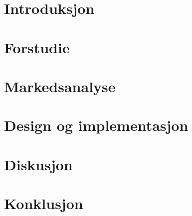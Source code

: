 \documentclass[11pt, a4paper]{report}
\newcommand{\comment}[1]{} \comment{This is a block comment wrapped in curly brackets}
\begin{document}


%
\begin{abstract}
\noindent

\end{abstract}

\pagestyle{empty}
\tableofcontents
\newpage
\pagestyle{fancy}


\comment{ foreløpig struktur på rapport:
Sammendrag
Innhold
Introduksjon
	Gruppen
	Initiativet
	Problemet
	Ideen
Pre study
	Mekanikk
	Hardware
	Software
Markedsundersøkelse
	generelt
	4 p'er
Løsning
	valg av løsning
	hardware
	software
		GUI
	diskusjon
Konklusjon
Referanseliste
Vedlegg
}
\chapter{Introduksjon}
	
	
	
	


\chapter{Forstudie}
	
	
	
	
	
\chapter{Markedsanalyse}
	
\chapter{Design og implementasjon}
	
	
	
	
	
\chapter{Diskusjon}
	
\chapter{Konklusjon}
%

\newpage
{}
\listoftables
\begingroup
\let\clearpage\relax
{}
\listoffigures
\endgroup
\newpage
{}



\newpage
{} %
\appendix
%
\end{document}
